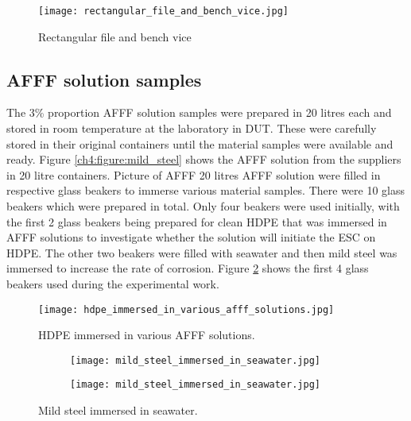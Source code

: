 \begin{figure}[H]
    \centering
    \texttt{[image: rectangular\_file\_and\_bench\_vice.jpg]}
    \caption{Rectangular file and bench vice}
    \label{ch4:figure:file_and_vice}
\end{figure}

\subsection{AFFF solution samples}
The 3\% proportion AFFF solution samples were prepared in 20 litres each and stored in room temperature at the laboratory in DUT. These were carefully stored in their original containers until the material samples were available and ready. Figure \ref{ch4:figure:mild_steel} shows the AFFF solution from the suppliers in 20 litre containers.
Picture of AFFF 20 litres
AFFF solution were filled in respective glass beakers to immerse various material samples. There were 10 glass beakers which were prepared in total. Only four beakers were used initially, with the first 2 glass beakers being prepared for clean HDPE that was immersed in AFFF solutions to investigate whether the solution will initiate the ESC on HDPE. The other two beakers were filled with seawater and then mild steel was immersed to increase the rate of corrosion. Figure \ref{ch4:figure:hdpe_immersed} shows the first 4 glass beakers used during the experimental work.
 
\begin{figure}[H]
    \centering
    \texttt{[image: hdpe\_immersed\_in\_various\_afff\_solutions.jpg]}
    \caption{HDPE immersed in various AFFF solutions.}
    \label{ch4:figure:hdpe_immersed}
\end{figure}
 
\begin{figure}[H]
\centering
\begin{subfigure}{\textwidth}
    \centering
    \texttt{[image: mild\_steel\_immersed\_in\_seawater.jpg]}
\end{subfigure}
\par\medskip
\begin{subfigure}{\textwidth}
    \centering
    \texttt{[image: mild\_steel\_immersed\_in\_seawater.jpg]}
\end{subfigure}

\caption{Mild steel immersed in seawater.}
\label{ch4:figure:steel_immersed}
\end{figure}

